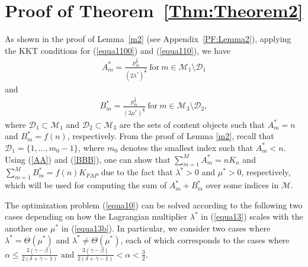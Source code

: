 \documentclass[10pt,journal,compsoc,onecolumn]{IEEEtran}
\begin{document}
\section{Proof of Theorem~\ref{Thm:Theorem2}}\label{PF:Theorem2}

As shown in the proof of Lemma~\ref{m2} (see
Appendix~\ref{PF:Lemma2}), applying the KKT conditions for
(\ref{equa1100}) and (\ref{equa110}), we have
\begin{align}
\label{L321}
 A_m^* =\frac{ p^{\frac{2}{3}}_m}{(2\lambda^*)^{\frac{2}{3}}}~\text{for}~m \in \mathcal{M}_1\setminus \mathcal{D}_1
\end{align}
and
\begin{align}
\label{L36}
   B_m^* =\frac{ p^{\frac{2}{3}}_m}{(2\mu^*)^{\frac{2}{3}}}~\text{for}~m \in \mathcal{M}_3\setminus \mathcal{D}_2,
\end{align}
where $\mathcal{D}_1\subset\mathcal{M}_1$ and
$\mathcal{D}_2\subset\mathcal{M}_3$ are the sets of content
objects such that $A_m^*=n$ and $B_m^*=f(n)$, respectively. From
the proof of Lemma \ref{m2}, recall that $\mathcal{D}_1=\lbrace
1,...,m_0-1\rbrace$, where $m_0$ denotes the smallest index such
that $A_{m}^*<n$. Using (\ref{AA}) and (\ref{BBB}), one can show
that $\sum_{m=1}^M A_m^* = nK_{n}$ and $\sum_{m=1}^M B_m^* =
f(n)K_{FAP}$ due to the fact that $\lambda^*>0$ and $\mu^*>0$,
respectively, which will be used for computing the sum of
$A_m^*+B_m^*$ over some indices in $\mathcal{M}$.

The optimization problem (\ref{equa10}) can be solved according to
the following two cases depending on how the Lagrangian multiplier
$\lambda^*$ in (\ref{equa13}) scales with the another one $\mu^*$
in (\ref{equa13b}). In particular, we consider two cases where
$\lambda^*=\Theta(\mu^*)$ and
$\lambda^*\neq\Theta\left(\mu^*\right)$, each of which corresponds
to the cases where $\alpha \leq
\frac{3(\gamma-\beta)}{2(\delta+\gamma-1)}$ and
$\frac{3(\gamma-\beta)}{2(\delta+\gamma-1)}<\alpha<\frac{3}{2}$.
\end{document}
